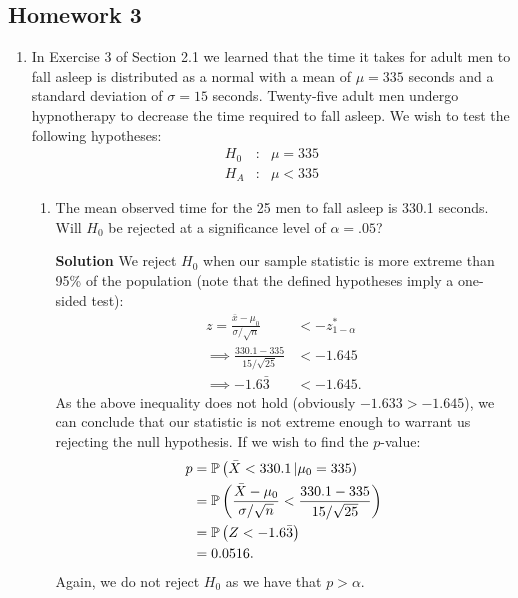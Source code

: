 \subsection{Homework 3}
\begin{enumerate}
    \item In Exercise 3 of Section 2.1 we learned that the time it takes for adult men to fall asleep is distributed as a normal with a mean of $\mu = 335$ seconds and a standard deviation of $\sigma = 15$ seconds. Twenty-five adult men undergo hypnotherapy to decrease the time required to fall asleep. We wish to test the following hypotheses:
    \[
    \begin{matrix}
    H_0 & : & \mu=335 \\
    H_A & : & \mu < 335
    \end{matrix}
    \]
    \begin{enumerate}
        \item The mean observed time for the 25 men to fall asleep is 330.1 seconds. Will $H_0$ be rejected at a significance level of $\alpha = .05$?
        \begin{framed}{\textbf{Solution}}
        We reject $H_0$ when our sample statistic is more extreme than 95\% of the population (note that the defined hypotheses imply a one-sided test):
        \begin{align}
            z = \frac{\bar{x} - \mu_0}{\sigma/\sqrt{n}} &< -z^*_{1 -\alpha} \\
            \implies \frac{330.1 - 335}{15/\sqrt{25}} &< -1.645 \\
            \implies -1.6\bar{3} &< -1.645.
        \end{align}
        As the above inequality does not hold (obviously $-1.633>-1.645$), we can conclude that our statistic is not extreme enough to warrant us rejecting the null hypothesis. If we wish to find the $p$-value:
        \begin{align}
            p &= \operatorname{\mathbb{P}}{\left( \bar{X}<330.1 \left| \mu_0 = 335 \right) \right. } \\
            &= \operatorname{\mathbb{P}}{\left( \frac{\bar{X} - \mu_0}{\sigma/\sqrt{n}} < \frac{330.1 - 335}{15/\sqrt{25}}\right)} \\
            &= \operatorname{\mathbb{P}}{\left( Z < -1.6\bar{3}\right)} \\
            &= 0.0516.
        \end{align}
        Again, we do not reject $H_0$ as we have that $p>\alpha$. 
        \end{framed}
        

\end{enumerate}
\end{enumerate}
